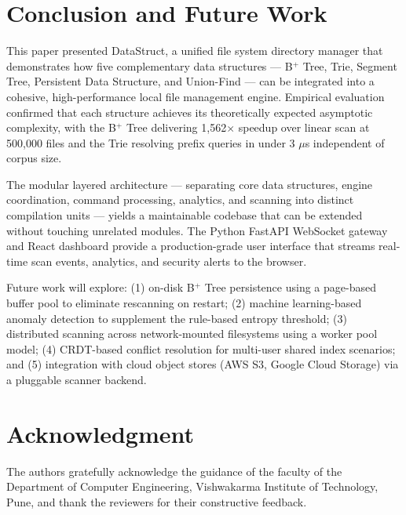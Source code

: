 \documentclass[conference]{IEEEtran}
\begin{document}
\section{Conclusion and Future Work}
\label{sec:conclusion}

This paper presented DataStruct, a unified file system directory manager that demonstrates how five complementary data structures — B$^+$ Tree, Trie, Segment Tree, Persistent Data Structure, and Union-Find — can be integrated into a cohesive, high-performance local file management engine. Empirical evaluation confirmed that each structure achieves its theoretically expected asymptotic complexity, with the B$^+$ Tree delivering 1{,}562$\times$ speedup over linear scan at 500{,}000 files and the Trie resolving prefix queries in under 3 $\mu$s independent of corpus size.

The modular layered architecture — separating core data structures, engine coordination, command processing, analytics, and scanning into distinct compilation units — yields a maintainable codebase that can be extended without touching unrelated modules. The Python FastAPI WebSocket gateway and React dashboard provide a production-grade user interface that streams real-time scan events, analytics, and security alerts to the browser.

Future work will explore: (1) on-disk B$^+$ Tree persistence using a page-based buffer pool to eliminate rescanning on restart; (2) machine learning-based anomaly detection to supplement the rule-based entropy threshold; (3) distributed scanning across network-mounted filesystems using a worker pool model; (4) CRDT-based conflict resolution for multi-user shared index scenarios; and (5) integration with cloud object stores (AWS S3, Google Cloud Storage) via a pluggable scanner backend.

\section*{Acknowledgment}

The authors gratefully acknowledge the guidance of the faculty of the Department of Computer Engineering, Vishwakarma Institute of Technology, Pune, and thank the reviewers for their constructive feedback.
\end{document}
